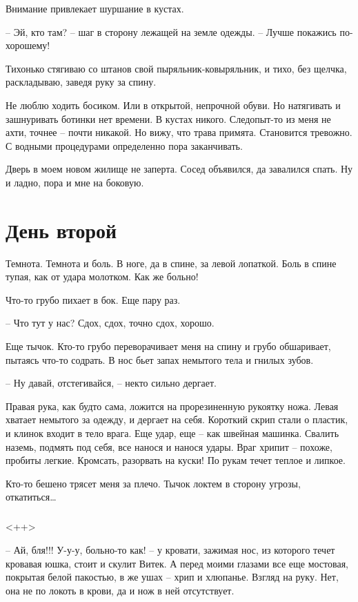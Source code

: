 \documentclass[a4paper]{book}
\begin{document}
Внимание привлекает шуршание в кустах. 


-- Эй, кто там? -- шаг в сторону лежащей на земле одежды. -- Лучше покажись по-хорошему!

Тихонько стягиваю со штанов свой пыряльник-ковыряльник, и тихо, без щелчка, раскладываю, заведя руку за спину.  

Не люблю ходить босиком. Или в открытой, непрочной обуви. Но натягивать и зашнуривать ботинки нет времени. В кустах никого. Следопыт-то из меня не ахти, точнее -- почти никакой. Но вижу, что трава примята. Становится тревожно. С водными процедурами определенно пора заканчивать.  

Дверь в моем новом жилище не заперта. Сосед объявился, да завалился спать. Ну и ладно, пора и мне на боковую. 

\chapter{День второй}
Темнота. Темнота и боль. В ноге, да в спине, за левой лопаткой. Боль в спине тупая, как от удара молотком. Как же больно!

Что-то грубо пихает в бок. Еще пару раз. 

-- Что тут у нас? Сдох, сдох, точно сдох, хорошо.

Еще тычок. Кто-то грубо переворачивает меня на спину и грубо обшаривает, пытаясь что-то содрать. В нос бьет запах немытого тела и гнилых зубов. 

-- Ну давай, отстегивайся, -- некто сильно дергает.

Правая рука, как будто сама, ложится на прорезиненную рукоятку ножа. Левая хватает немытого за одежду, и дергает на себя. Короткий скрип стали о пластик, и клинок  входит в тело врага. Еще удар, еще -- как швейная машинка. Свалить наземь, подмять под себя, все нанося и нанося удары. Враг хрипит -- похоже, пробиты легкие. Кромсать, разорвать на куски! По рукам течет теплое и липкое.

Кто-то бешено трясет меня за плечо. Тычок локтем в сторону угрозы, откатиться\ldots
\\
\paragraph{}<++>


-- Ай, бля!!! У-у-у, больно-то как! -- у кровати, зажимая нос, из которого течет кровавая юшка, стоит и скулит Витек. А перед моими глазами все еще мостовая, покрытая белой пакостью, в же ушах -- хрип и хлюпанье. Взгляд на руку. Нет, она не по локоть в крови, да и нож в ней отсутствует.
\end{document}
